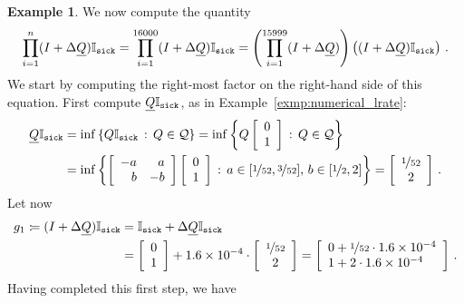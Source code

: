 \documentclass[10pt,a4paper]{paper}
\theoremstyle{definition}
\newtheorem{exmp}{Example}%
\newcommand{\ind}[1]{\mathbb{I}_{#1}}
\newcommand{\rateset}{\mathcal{Q}}
\newcommand{\lrate}{\underline{Q}}
\newcommand{\coloneqq}{:\!=}
\begin{document}
\begin{exmp}
We now compute the quantity
\begin{equation*}
\prod_{i=1}^n(I + \Delta\lrate)\ind{\text{{\tt sick}}} = \prod_{i=1}^{16000}(I + \Delta\lrate)\ind{\text{{\tt sick}}} = \left(\prod_{i=1}^{15999}(I + \Delta\lrate)\right)\left((I+\Delta\lrate)\ind{\text{{\tt sick}}}\right)\,.
\end{equation*}
We start by computing the right-most factor on the right-hand side of this equation. First compute $\lrate\ind{\text{{\tt sick}}}$, as in Example~\ref{exmp:numerical_lrate}:
\begin{align*}
\lrate\ind{\text{{\tt sick}}} &= \inf\left\{ Q\ind{\text{{\tt sick}}}\,:\,Q\in\rateset \right\} = \inf\left\{ Q \left[\begin{array}{c} 0\\ 1 \end{array}\right]\,:\,Q\in\rateset \right\} \\
 &= \inf\left\{ \left[\begin{array}{rr}-a&a\\b&-b \end{array}\right] \left[\begin{array}{c} 0\\ 1 \end{array}\right]\,:\, a\in[\nicefrac{1}{52},\nicefrac{3}{52}],\,b\in[\nicefrac{1}{2},2]\right\} = \left[\begin{array}{c}\nicefrac{1}{52}\\2\end{array}\right]\,.
\end{align*}
Let now
\begin{align*}
g_1 \coloneqq (I + \Delta\lrate)\ind{\text{{\tt sick}}} &= \ind{\text{{\tt sick}}} + \Delta\lrate\ind{\text{{\tt sick}}} \\
 &= \left[\begin{array}{c}0\\1\end{array}\right] + 1.6\times 10^{-4}\cdot\left[\begin{array}{c}\nicefrac{1}{52}\\2\end{array}\right] = \left[\begin{array}{l} 0 + \nicefrac{1}{52}\cdot 1.6\times 10^{-4}\\ 1 + 2\cdot 1.6\times 10^{-4}\end{array}\right]\,.
\end{align*}
Having completed this first step, we have
\begin{equation*}

\end{equation*}
\end{exmp}
\end{document}
